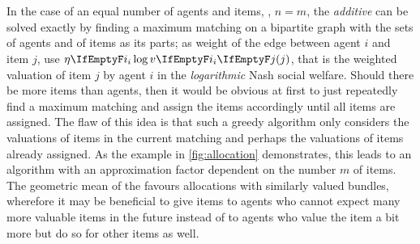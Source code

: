 \section{\texorpdfstring{\SMatch}{SMatch}}
\label{sec:smatch}

In the case of an equal number of agents and items, \ie, \(n = m\), the \emph{additive} \NSW{} can be solved exactly by finding a maximum matching on a bipartite graph with the sets of agents and of items as its parts;
as weight of the edge between agent \(i\) and item \(j\), use \(\weight \log \valuations[j]\), that is the weighted valuation of item \(j\) by agent \(i\) in the \emph{logarithmic} Nash social welfare.
Should there be more items than agents, then it would be obvious at first to just repeatedly find a maximum matching and assign the items accordingly until all items are assigned.
The flaw of this idea is that such a greedy algorithm only considers the valuations of items in the current matching and perhaps the valuations of items already assigned.
As the example in \cref{fig:allocation} demonstrates, this leads to an algorithm with an approximation factor dependent on the number \(m\) of items.
The geometric mean of the \NSW{} favours allocations with similarly valued bundles, wherefore it may be beneficial to give items to agents who cannot expect many more valuable items in the future instead of to agents who value the item a bit more but do so for other items as well.

